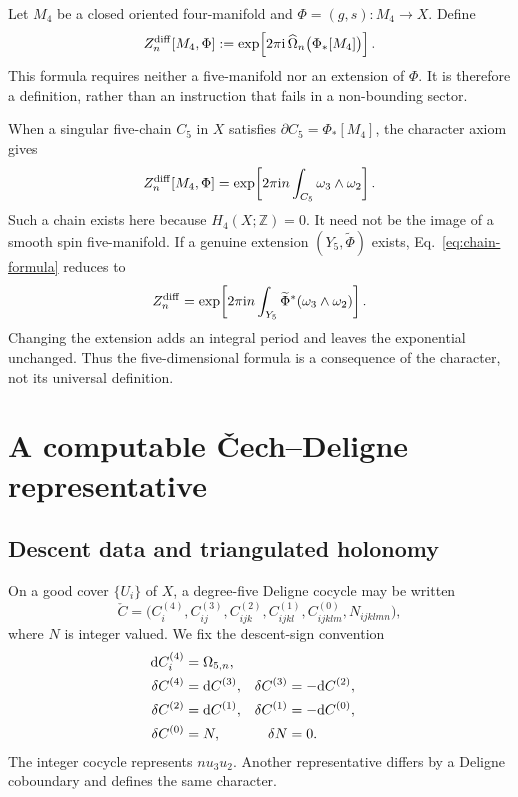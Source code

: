\documentclass[11pt]{article}
\theoremstyle{definition}
\theoremstyle{remark}
\newcommand{\dd}{\mathrm d}
\newcommand{\ii}{\mathrm i}
\newcommand{\ZZ}{\mathbb Z}
\begin{document}
Let \(M_4\) be a closed oriented four-manifold and
\(\Phi=(g,s):M_4\to X\).  Define
\begin{equation}
 Z_n^{\rm diff}[M_4,\Phi]
 :=\exp\!\left[2\pi\ii\,
 \widehat\Omega_n\bigl(\Phi_*[M_4]\bigr)\right].
 \label{eq:global-holonomy}
\end{equation}
This formula requires neither a five-manifold nor an extension of \(\Phi\).
It is therefore a definition, rather than an instruction that fails in a
non-bounding sector.

When a singular five-chain \(C_5\) in \(X\) satisfies
\(\partial C_5=\Phi_*[M_4]\), the character axiom gives
\begin{equation}
 Z_n^{\rm diff}[M_4,\Phi]
 =\exp\!\left[2\pi\ii n\int_{C_5}\omega_3\wedge\omega_2\right].
 \label{eq:chain-formula}
\end{equation}
Such a chain exists here because \(H_4(X;\ZZ)=0\).  It need not be the image
of a smooth spin five-manifold.  If a genuine extension
\((Y_5,\widetilde\Phi)\) exists, Eq.~\eqref{eq:chain-formula} reduces to
\begin{equation}
 Z_n^{\rm diff}
 =\exp\!\left[2\pi\ii n\int_{Y_5}
 \widetilde\Phi^*(\omega_3\wedge\omega_2)\right].
 \label{eq:five-manifold-limit}
\end{equation}
Changing the extension adds an integral period and leaves the exponential
unchanged.  Thus the five-dimensional formula is a consequence of the
character, not its universal definition.

\section{A computable \v{C}ech--Deligne representative}

\subsection{Descent data and triangulated holonomy}

On a good cover \(\{U_i\}\) of \(X\), a degree-five Deligne cocycle may be
written
\begin{equation}
 \check C=
 \bigl(C_i^{(4)},C_{ij}^{(3)},C_{ijk}^{(2)},
 C_{ijkl}^{(1)},C_{ijklm}^{(0)},N_{ijklmn}\bigr),
 \label{eq:deligne-data}
\end{equation}
where \(N\) is integer valued.  We fix the descent-sign convention
\begin{align}
 \dd C_i^{(4)}&=\Omega_{5,n},\notag\\
 \delta C^{(4)}&=\dd C^{(3)},&
 \delta C^{(3)}&=-\dd C^{(2)},\notag\\
 \delta C^{(2)}&=\dd C^{(1)},&
 \delta C^{(1)}&=-\dd C^{(0)},\notag\\
 \delta C^{(0)}&=N,&\delta N&=0.
 \label{eq:descent-equations}
\end{align}
The integer cocycle represents \(n u_3u_2\).  Another representative differs
by a Deligne coboundary and defines the same character.
\end{document}
